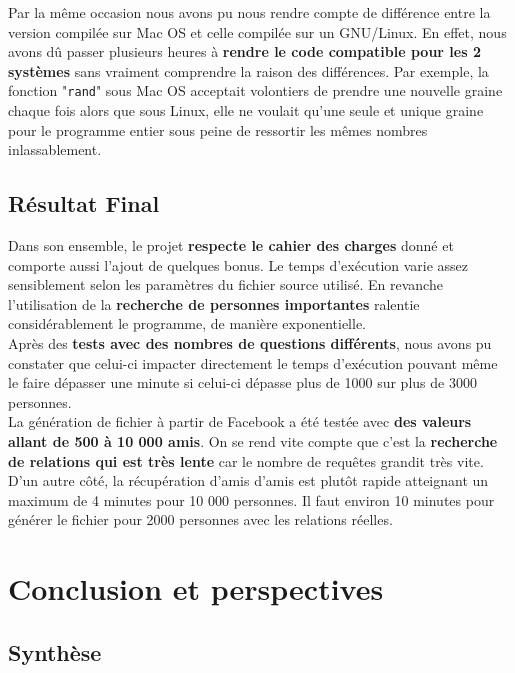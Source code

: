 \documentclass[a4paper, titlepage, oneside]{book}
\begin{document}
Par la même occasion nous avons pu nous rendre compte de différence entre la version compilée sur Mac OS et celle compilée sur un GNU/Linux. En effet, nous avons dû passer plusieurs heures à \textbf{rendre le code compatible pour les 2 systèmes} sans vraiment comprendre la raison des différences. Par exemple, la fonction "\texttt{rand}" sous Mac OS acceptait volontiers de prendre une nouvelle graine chaque fois alors que sous Linux, elle ne voulait qu'une seule et unique graine pour le programme entier sous peine de ressortir les mêmes nombres inlassablement.\\

\section{Résultat Final}

Dans son ensemble, le projet \textbf{respecte le cahier des charges} donné et comporte aussi l'ajout de quelques bonus. Le temps d'exécution varie assez sensiblement selon les paramètres du fichier source utilisé. En revanche l'utilisation de la \textbf{recherche de personnes importantes} ralentie considérablement le programme, de manière exponentielle.\\
Après des \textbf{tests avec des nombres de questions différents}, nous avons pu constater que celui-ci impacter directement le temps d'exécution pouvant même le faire dépasser une minute si celui-ci dépasse plus de 1000 sur plus de 3000 personnes.\\

La génération de fichier à partir de Facebook a été testée avec \textbf{des valeurs allant de 500 à 10 000 amis}. On se rend vite compte que c'est la \textbf{recherche de relations qui est très lente} car le nombre de requêtes grandit très vite. D'un autre côté, la récupération d'amis d'amis est plutôt rapide atteignant un maximum de 4 minutes pour 10 000 personnes. Il faut environ 10 minutes pour générer le fichier pour 2000 personnes avec les relations réelles.\\

\chapter{Conclusion et perspectives}

\section{Synthèse}
\end{document}
